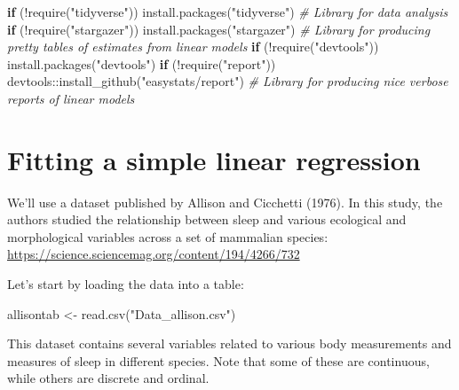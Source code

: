 \documentclass[
]{book}
\newenvironment{Shaded}{\begin{snugshade}}{\end{snugshade}}
\newcommand{\CommentTok}[1]{\textcolor[rgb]{0.56,0.35,0.01}{\textit{#1}}}
\newcommand{\ControlFlowTok}[1]{\textcolor[rgb]{0.13,0.29,0.53}{\textbf{#1}}}
\newcommand{\FunctionTok}[1]{\textcolor[rgb]{0.00,0.00,0.00}{#1}}
\newcommand{\NormalTok}[1]{#1}
\newcommand{\OtherTok}[1]{\textcolor[rgb]{0.56,0.35,0.01}{#1}}
\newcommand{\SpecialCharTok}[1]{\textcolor[rgb]{0.00,0.00,0.00}{#1}}
\newcommand{\StringTok}[1]{\textcolor[rgb]{0.31,0.60,0.02}{#1}}
\begin{document}
\begin{Shaded}
\begin{Highlighting}[]
\ControlFlowTok{if}\NormalTok{ (}\SpecialCharTok{!}\FunctionTok{require}\NormalTok{(}\StringTok{"tidyverse"}\NormalTok{)) }\FunctionTok{install.packages}\NormalTok{(}\StringTok{"tidyverse"}\NormalTok{) }\CommentTok{\# Library for data analysis}
\ControlFlowTok{if}\NormalTok{ (}\SpecialCharTok{!}\FunctionTok{require}\NormalTok{(}\StringTok{"stargazer"}\NormalTok{)) }\FunctionTok{install.packages}\NormalTok{(}\StringTok{"stargazer"}\NormalTok{) }\CommentTok{\# Library for producing pretty tables of estimates from linear models}
\ControlFlowTok{if}\NormalTok{ (}\SpecialCharTok{!}\FunctionTok{require}\NormalTok{(}\StringTok{"devtools"}\NormalTok{)) }\FunctionTok{install.packages}\NormalTok{(}\StringTok{"devtools"}\NormalTok{)}
\ControlFlowTok{if}\NormalTok{ (}\SpecialCharTok{!}\FunctionTok{require}\NormalTok{(}\StringTok{"report"}\NormalTok{)) devtools}\SpecialCharTok{::}\FunctionTok{install\_github}\NormalTok{(}\StringTok{"easystats/report"}\NormalTok{) }\CommentTok{\# Library for producing nice verbose reports of linear models}
\end{Highlighting}
\end{Shaded}

\hypertarget{fitting-a-simple-linear-regression-1}{%
\section{Fitting a simple linear regression}\label{fitting-a-simple-linear-regression-1}}

We'll use a dataset published by Allison and Cicchetti (1976). In this study, the authors studied the relationship between sleep and various ecological and morphological variables across a set of mammalian species:
\url{https://science.sciencemag.org/content/194/4266/732}

Let's start by loading the data into a table:

\begin{Shaded}
\begin{Highlighting}[]
\NormalTok{allisontab }\OtherTok{\textless{}{-}} \FunctionTok{read.csv}\NormalTok{(}\StringTok{"Data\_allison.csv"}\NormalTok{)}
\end{Highlighting}
\end{Shaded}

This dataset contains several variables related to various body measurements and measures of sleep in different species. Note that some of these are continuous, while others are discrete and ordinal.
\end{document}
